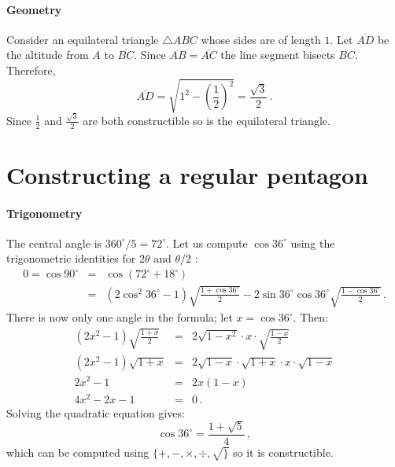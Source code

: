 \documentclass[11pt,a4paper]{article}
\newenvironment{form}[1]{%
\begin{displaymath}%
\renewcommand{\arraystretch}{#1}%
\begin{array}{lcl}}%
{\end{array}%
\end{displaymath}%
}
\newcommand*{\disfrac}[2]{\displaystyle\frac{#1}{#2}}
\begin{document}
\paragraph{Geometry} Consider an equilateral triangle $\triangle ABC$ whose sides are of length $1$. Let $\overline{AD}$ be the altitude from $A$ to $\overline{BC}$. Since $\overline{AB}=\overline{AC}$ the line segment bisects $\overline{BC}$. Therefore,
\[
\overline{AD}=\sqrt{1^2-\left(\disfrac{1}{2}\right)^2}=\disfrac{\sqrt{3}}{2}\,.
\]
Since $\frac{1}{2}$ and $\frac{\sqrt{3}}{2}$ are both constructible so is the equilateral triangle.
\begin{center}
\end{center}


\section{Constructing a regular pentagon}\label{a.pentagon}

\paragraph{Trigonometry}
The central angle is $360^\circ/5=72^\circ$. Let us compute $\cos 36^\circ$ using the  trigonometric identities for $2\theta$ and $\theta/2$ \cite{wiki:pentagon}:
\begin{form}{1.5}
0=\cos 90^\circ &=& \cos(72^\circ+18^\circ)\\
&=&(2\cos^2 36^\circ-1)\sqrt{\disfrac{1+\cos 36^\circ}{2}}-2\sin 36^\circ\cos 36^\circ\sqrt{\disfrac{1-\cos 36^\circ}{2}}\,.
\end{form}
There is now only one angle in the formula; let $x=\cos 36^\circ$. Then:
\begin{form}{1.5}
(2x^2-1)\sqrt{\disfrac{1+x}{2}}&=&2\sqrt{1-x^2}\cdot x \cdot \sqrt{\disfrac{1-x}{2}}\\
(2x^2-1)\sqrt{1+x}&=&2\sqrt{1-x}\cdot\sqrt{1+x}\cdot x \cdot \sqrt{1-x}\\
2x^2-1&=&2x(1-x)\\
4x^2-2x-1&=&0\,.
\end{form}
Solving the quadratic equation gives:
\[
\cos 36^\circ = \disfrac{1+\sqrt{5}}{4}\,,
\]
which can be computed using $\{+,-,\times,\div,\surd\}$ so it is constructible.
\end{document}
